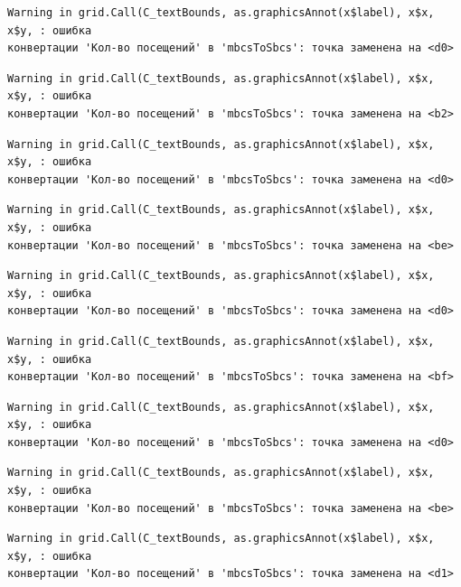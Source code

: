 \documentclass[
  letterpaper,
  DIV=11,
  numbers=noendperiod]{scrreprt}
\begin{document}
\begin{verbatim}
Warning in grid.Call(C_textBounds, as.graphicsAnnot(x$label), x$x, x$y, : ошибка
конвертации 'Кол-во посещений' в 'mbcsToSbcs': точка заменена на <d0>
\end{verbatim}

\begin{verbatim}
Warning in grid.Call(C_textBounds, as.graphicsAnnot(x$label), x$x, x$y, : ошибка
конвертации 'Кол-во посещений' в 'mbcsToSbcs': точка заменена на <b2>
\end{verbatim}

\begin{verbatim}
Warning in grid.Call(C_textBounds, as.graphicsAnnot(x$label), x$x, x$y, : ошибка
конвертации 'Кол-во посещений' в 'mbcsToSbcs': точка заменена на <d0>
\end{verbatim}

\begin{verbatim}
Warning in grid.Call(C_textBounds, as.graphicsAnnot(x$label), x$x, x$y, : ошибка
конвертации 'Кол-во посещений' в 'mbcsToSbcs': точка заменена на <be>
\end{verbatim}

\begin{verbatim}
Warning in grid.Call(C_textBounds, as.graphicsAnnot(x$label), x$x, x$y, : ошибка
конвертации 'Кол-во посещений' в 'mbcsToSbcs': точка заменена на <d0>
\end{verbatim}

\begin{verbatim}
Warning in grid.Call(C_textBounds, as.graphicsAnnot(x$label), x$x, x$y, : ошибка
конвертации 'Кол-во посещений' в 'mbcsToSbcs': точка заменена на <bf>
\end{verbatim}

\begin{verbatim}
Warning in grid.Call(C_textBounds, as.graphicsAnnot(x$label), x$x, x$y, : ошибка
конвертации 'Кол-во посещений' в 'mbcsToSbcs': точка заменена на <d0>
\end{verbatim}

\begin{verbatim}
Warning in grid.Call(C_textBounds, as.graphicsAnnot(x$label), x$x, x$y, : ошибка
конвертации 'Кол-во посещений' в 'mbcsToSbcs': точка заменена на <be>
\end{verbatim}

\begin{verbatim}
Warning in grid.Call(C_textBounds, as.graphicsAnnot(x$label), x$x, x$y, : ошибка
конвертации 'Кол-во посещений' в 'mbcsToSbcs': точка заменена на <d1>
\end{verbatim}
\end{document}
